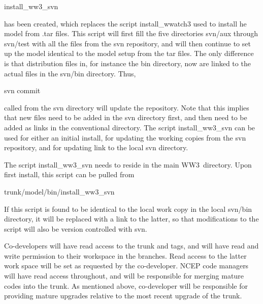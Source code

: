 \documentclass[12pt]{article}
\newcommand{\ws}{WW3}
\newcommand{\file}{\sf}
\begin{document}
\vspace{\baselineskip}
\centerline{\file install\_ww3\_svn}
\vspace{\baselineskip}

\noindent
has been created, which replaces the script {\file install\_wwatch3} used to
install he model from {\file .tar} files. This script will first fill the five
directories {\file svn/aux} through {\file svn/test} with all the files from
the svn repository, and will then continue to set up the model identical to
the model setup from the tar files. The only difference is that distribution
files in, for instance the {\file bin} directory, now are linked to the actual
files in the {\file svn/bin} directory. Thus,

\vspace{\baselineskip}
\centerline{\file svn commit}
\vspace{\baselineskip}

\noindent
called from the {\file svn} directory will update the repository. Note that
this implies that new files need to be added in the {\file svn} directory
first, and then need to be added as links in the conventional directory. The
script {\file install\_ww3\_svn} can be used for either an initial install,
for updating the working copies from the svn repository, and for updating link
to the local {\file svn} directory.

The script {\file install\_ww3\_svn} needs to reside in the main \ws\
directory. Upon first install, this script can be pulled from

\vspace{\baselineskip}
\centerline{\file trunk/model/bin/install\_ww3\_svn}
\vspace{\baselineskip}

\noindent
If this script is found to be identical to the local work copy in the local
{\file svn/bin} directory, it will be replaced with a link to the latter, so
that modifications to the script will also be version controlled with svn.

Co-developers will have read access to the {\file trunk} and {\file tags}, and
will have read and write permission to their workspace in the {\file
branches}. Read access to the latter work space will be set as requested by
the co-developer. NCEP code managers will have read access throughout, and
will be responsible for merging mature codes into the {\file trunk}. As
mentioned above, co-developer will be responsible for providing mature
upgrades relative to the most recent upgrade of the {\file trunk}.
\end{document}
